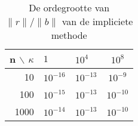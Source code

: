 \begin{table}[H]
\begin{center}
\begin{tabular}{r|llc}
n $\backslash$ $\kappa$ & $1$ & $10^4$ & $10^8$ \\\hline
10 & $10^{-16}$ & $10^{-13}$ & $10^{-9}$ \\
100 & $10^{-15}$ & $10^{-13}$ & $10^{-10}$ \\
1000 & $10^{-14}$ & $10^{-13}$ & $10^{-10}$
\end{tabular}
\end{center}
\caption{De ordegrootte van $\lVert r \rVert/\lVert b \rVert$ van de impliciete methode}
\label{rb_imp}
\end{table}